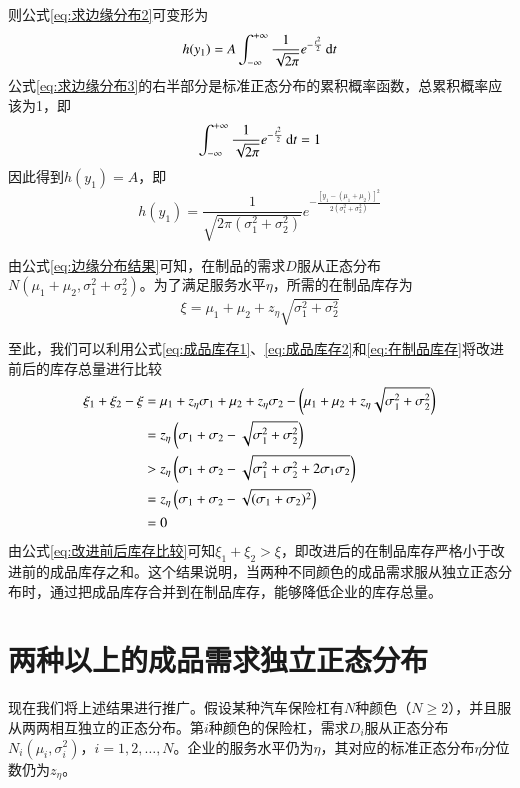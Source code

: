 则公式\ref{eq:求边缘分布2}可变形为
\begin{equation}
h(y_1) = A\int_{-\infty}^{+\infty}\frac{1}{\sqrt{2\pi}}e^{-\frac{t^2}{2}}\operatorname{d\!} t
\label{eq:求边缘分布3}
\end{equation}
公式\ref{eq:求边缘分布3}的右半部分是标准正态分布的累积概率函数，总累积概率应该为1，即
\[
\int_{-\infty}^{+\infty}\frac{1}{\sqrt{2\pi}}e^{-\frac{t^2}{2}}\operatorname{d\!} t = 1
\]
因此得到$h(y_1)=A$，即
\begin{equation}
h(y_1) = \frac{1}{\sqrt{2\pi(\sigma_1^2+\sigma_2^2)}}e^{-\frac{[y_1-(\mu_1+\mu_2)]^2}{2(\sigma_1^2+\sigma_2^2)}}
\label{eq:边缘分布结果}
\end{equation}

由公式\ref{eq:边缘分布结果}可知，在制品的需求$D$服从正态分布$N(\mu_1+\mu_2,\sigma_1^2+\sigma_2^2)$。为了满足服务水平$\eta$，所需的在制品库存为
\begin{equation}
\xi = \mu_1 + \mu_2 + z_\eta\sqrt{\sigma_1^2+\sigma_2^2}
\label{eq:在制品库存}
\end{equation}

至此，我们可以利用公式\ref{eq:成品库存1}、\ref{eq:成品库存2}和\ref{eq:在制品库存}将改进前后的库存总量进行比较
\begin{align}
\xi_1 + \xi_2 - \xi &= \mu_1 + z_\eta\sigma_1 + \mu_2 + z_\eta\sigma_2 - \left(\mu_1 + \mu_2 + z_\eta\sqrt{\sigma_1^2+\sigma_2^2}\right) \notag\\
&= z_\eta\left(\sigma_1+\sigma_2-\sqrt{\sigma_1^2+\sigma_2^2}\right) \notag\\
&> z_\eta\left(\sigma_1+\sigma_2-\sqrt{\sigma_1^2+\sigma_2^2+2\sigma_1\sigma_2}\right) \notag\\
&= z_\eta\left(\sigma_1+\sigma_2-\sqrt{(\sigma_1+\sigma_2)^2}\right) \notag\\
&= 0
\label{eq:改进前后库存比较}
\end{align}
由公式\ref{eq:改进前后库存比较}可知$\xi_1+\xi_2>\xi$，即改进后的在制品库存严格小于改进前的成品库存之和。这个结果说明，当两种不同颜色的成品需求服从独立正态分布时，通过把成品库存合并到在制品库存，能够降低企业的库存总量。



\section{两种以上的成品需求独立正态分布}

现在我们将上述结果进行推广。假设某种汽车保险杠有$N$种颜色（$N\geq 2$），并且服从两两相互独立的正态分布。第$i$种颜色的保险杠，需求$D_i$服从正态分布$N_i(\mu_i,\sigma_i^2)$，$i=1,2,\ldots,N$。企业的服务水平仍为$\eta$，其对应的标准正态分布$\eta$分位数仍为$z_\eta$。

